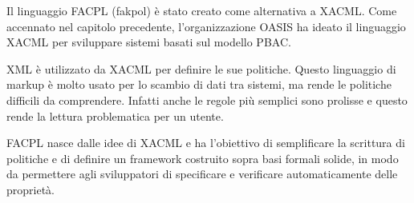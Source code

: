 \label{chap:Formal Access Control Policy Language}
Il linguaggio FACPL (fakpol) è stato creato come alternativa a XACML. Come accennato nel capitolo precedente,
l'organizzazione OASIS ha ideato il linguaggio XACML per sviluppare sistemi basati sul modello PBAC.\par
XML è utilizzato da XACML per definire le sue politiche. Questo linguaggio di markup è molto usato per lo scambio
di dati tra sistemi, ma rende le politiche difficili da comprendere. Infatti anche le regole più semplici sono prolisse
e questo rende la lettura problematica per un utente.\par
FACPL nasce dalle idee di XACML e ha l'obiettivo di semplificare la scrittura di politiche e di definire un framework
costruito sopra basi formali solide, in modo da permettere agli sviluppatori di specificare e verificare automaticamente
delle proprietà.

